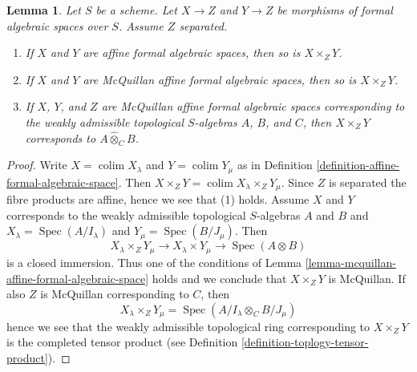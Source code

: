 \documentclass{stacks-project}
\theoremstyle{plain}
\newtheorem{lemma}[subsection]{Lemma}
\theoremstyle{definition}
\theoremstyle{remark}
\numberwithin{equation}{subsection}
\def\colim{\mathop{\mathrm{colim}}\nolimits}
\def\Spec{\mathop{\mathrm{Spec}}}
\begin{document}
\begin{lemma}
\label{lemma-fibre-product-affines-over-separated}
Let $S$ be a scheme. Let $X \to Z$ and $Y \to Z$ be morphisms
of formal algebraic spaces over $S$. Assume $Z$ separated.
\begin{enumerate}
\item If $X$ and $Y$ are affine formal algebraic spaces, then
so is $X \times_Z Y$.
\item If $X$ and $Y$ are McQuillan affine formal algebraic spaces, then
so is $X \times_Z Y$.
\item If $X$, $Y$, and $Z$ are McQuillan affine formal algebraic spaces
corresponding to the weakly admissible topological $S$-algebras
$A$, $B$, and $C$, then $X \times_Z Y$ corresponds to
$A \widehat{\otimes}_C B$.
\end{enumerate}
\end{lemma}

\begin{proof}
Write $X = \colim X_\lambda$ and $Y = \colim Y_\mu$ as
in Definition \ref{definition-affine-formal-algebraic-space}.
Then $X \times_Z Y = \colim X_\lambda \times_Z Y_\mu$.
Since $Z$ is separated the fibre products are affine, hence
we see that (1) holds. Assume $X$ and $Y$ corresponds to
the weakly admissible topological $S$-algebras $A$ and $B$
and $X_\lambda = \Spec(A/I_\lambda)$ and $Y_\mu = \Spec(B/J_\mu)$.
Then
$$
X_\lambda \times_Z Y_\mu \to
X_\lambda \times Y_\mu \to \Spec(A \otimes B)
$$
is a closed immersion. Thus one of the conditions of
Lemma \ref{lemma-mcquillan-affine-formal-algebraic-space}
holds and we conclude that $X \times_Z Y$ is McQuillan.
If also $Z$ is McQuillan corresponding to $C$, then
$$
X_\lambda \times_Z Y_\mu = \Spec(A/I_\lambda \otimes_C B/J_\mu)
$$
hence we see that the weakly admissible topological ring
corresponding to $X \times_Z Y$ is the completed tensor product
(see Definition \ref{definition-toplogy-tensor-product}).
\end{proof}
\end{document}
